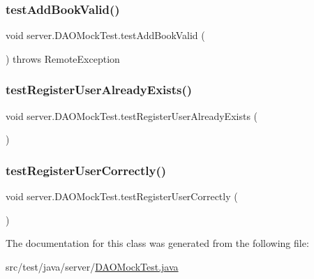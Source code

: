\subsubsection{\texorpdfstring{test\+Add\+Book\+Valid()}{testAddBookValid()}}
{\footnotesize\ttfamily void server.\+D\+A\+O\+Mock\+Test.\+test\+Add\+Book\+Valid (\begin{DoxyParamCaption}{ }\end{DoxyParamCaption}) throws Remote\+Exception}

\mbox{\label{classserver_1_1_d_a_o_mock_test_acb2d8f72de99513b776086c9cac2e481}} 
\subsubsection{\texorpdfstring{test\+Register\+User\+Already\+Exists()}{testRegisterUserAlreadyExists()}}
{\footnotesize\ttfamily void server.\+D\+A\+O\+Mock\+Test.\+test\+Register\+User\+Already\+Exists (\begin{DoxyParamCaption}{ }\end{DoxyParamCaption})}

\mbox{\label{classserver_1_1_d_a_o_mock_test_a25088a79f562d82b1e09deb3c8d62fab}} 
\subsubsection{\texorpdfstring{test\+Register\+User\+Correctly()}{testRegisterUserCorrectly()}}
{\footnotesize\ttfamily void server.\+D\+A\+O\+Mock\+Test.\+test\+Register\+User\+Correctly (\begin{DoxyParamCaption}{ }\end{DoxyParamCaption})}



The documentation for this class was generated from the following file\+:\begin{DoxyCompactItemize}
\item 
src/test/java/server/\hyperlink{_d_a_o_mock_test_8java}{D\+A\+O\+Mock\+Test.\+java}\end{DoxyCompactItemize}
